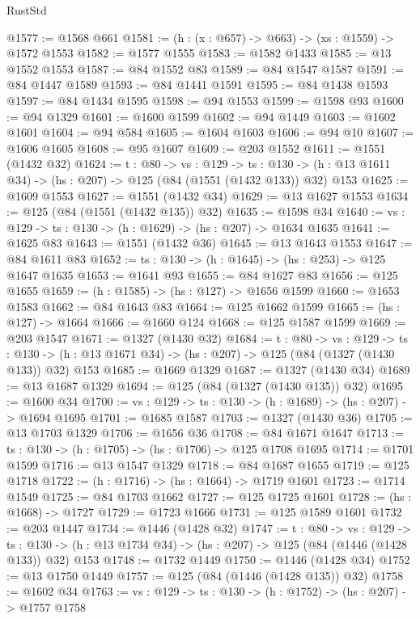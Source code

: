 \begin{lexlean}{RustStd}
\begin{coremodule}
{\begin{coremodule}
{{{{{{{{{{{{{{{@1577 := @1568 @661
@1581 := (h : (x : @657) -> @663) -> (xs : @1559) -> @1572 @1553
@1582 := @1577 @1555
@1583 := @1582 @1433
@1585 := @13 @1552 @1553
@1587 := @84 @1552 @83
@1589 := @84 @1547 @1587
@1591 := @84 @1447 @1589
@1593 := @84 @1441 @1591
@1595 := @84 @1438 @1593
@1597 := @84 @1434 @1595
@1598 := @94 @1553
@1599 := @1598 @93
@1600 := @94 @1329
@1601 := @1600 @1599
@1602 := @94 @1449
@1603 := @1602 @1601
@1604 := @94 @584
@1605 := @1604 @1603
@1606 := @94 @10
@1607 := @1606 @1605
@1608 := @95 @1607
@1609 := @203 @1552
@1611 := @1551 (@1432 @32)
@1624 := {t : @80} ->
  {vs : @129} ->
  {ts : @130} -> (h : @13 @1611 @34) -> (hs : @207) -> @125 (@84 (@1551 (@1432 @133)) @32) @153
@1625 := @1609 @1553
@1627 := @1551 (@1432 @34)
@1629 := @13 @1627 @1553
@1634 := @125 (@84 (@1551 (@1432 @135)) @32)
@1635 := @1598 @34
@1640 := {vs : @129} -> {ts : @130} -> (h : @1629) -> (hs : @207) -> @1634 @1635
@1641 := @1625 @83
@1643 := @1551 (@1432 @36)
@1645 := @13 @1643 @1553
@1647 := @84 @1611 @83
@1652 := {ts : @130} -> (h : @1645) -> (hs : @253) -> @125 @1647 @1635
@1653 := @1641 @93
@1655 := @84 @1627 @83
@1656 := @125 @1655
@1659 := (h : @1585) -> (hs : @127) -> @1656 @1599
@1660 := @1653 @1583
@1662 := @84 @1643 @83
@1664 := @125 @1662 @1599
@1665 := (hs : @127) -> @1664
@1666 := @1660 @124
@1668 := @125 @1587 @1599
@1669 := @203 @1547
@1671 := @1327 (@1430 @32)
@1684 := {t : @80} ->
  {vs : @129} ->
  {ts : @130} -> (h : @13 @1671 @34) -> (hs : @207) -> @125 (@84 (@1327 (@1430 @133)) @32) @153
@1685 := @1669 @1329
@1687 := @1327 (@1430 @34)
@1689 := @13 @1687 @1329
@1694 := @125 (@84 (@1327 (@1430 @135)) @32)
@1695 := @1600 @34
@1700 := {vs : @129} -> {ts : @130} -> (h : @1689) -> (hs : @207) -> @1694 @1695
@1701 := @1685 @1587
@1703 := @1327 (@1430 @36)
@1705 := @13 @1703 @1329
@1706 := @1656 @36
@1708 := @84 @1671 @1647
@1713 := {ts : @130} -> (h : @1705) -> (hs : @1706) -> @125 @1708 @1695
@1714 := @1701 @1599
@1716 := @13 @1547 @1329
@1718 := @84 @1687 @1655
@1719 := @125 @1718
@1722 := (h : @1716) -> (hs : @1664) -> @1719 @1601
@1723 := @1714 @1549
@1725 := @84 @1703 @1662
@1727 := @125 @1725 @1601
@1728 := (hs : @1668) -> @1727
@1729 := @1723 @1666
@1731 := @125 @1589 @1601
@1732 := @203 @1447
@1734 := @1446 (@1428 @32)
@1747 := {t : @80} ->
  {vs : @129} ->
  {ts : @130} -> (h : @13 @1734 @34) -> (hs : @207) -> @125 (@84 (@1446 (@1428 @133)) @32) @153
@1748 := @1732 @1449
@1750 := @1446 (@1428 @34)
@1752 := @13 @1750 @1449
@1757 := @125 (@84 (@1446 (@1428 @135)) @32)
@1758 := @1602 @34
@1763 := {vs : @129} -> {ts : @130} -> (h : @1752) -> (hs : @207) -> @1757 @1758
}}}}}}}}}}}}}}}
\end{coremodule}}
\end{coremodule}
\end{lexlean}

